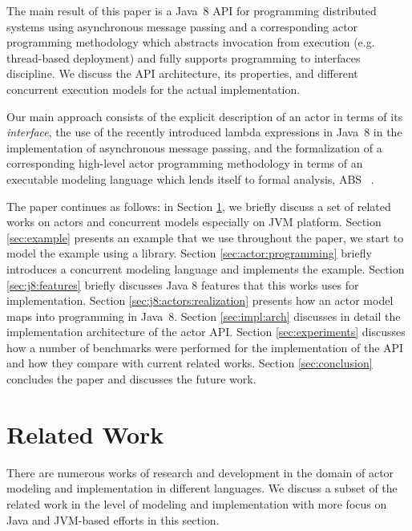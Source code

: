 The main result of this paper is a Java~8 API for programming distributed systems
using asynchronous message passing and a corresponding actor programming methodology 
which abstracts invocation from execution (e.g. thread-based deployment) and fully supports
 programming to interfaces discipline.
We  discuss the API architecture, its properties, and different concurrent execution models for the actual implementation.

Our main approach consists of the explicit description of an actor in terms of its \emph{interface}, 
the use of the recently introduced lambda expressions in Java~8 in the  implementation of asynchronous message passing,  
and the formalization of a corresponding high-level actor programming methodology in terms of an executable modeling language
which lends itself to formal analysis, ABS ~\cite{johnsen2012abs}.

The paper continues as follows: 
in Section \ref{sec:relatedwork}, we briefly discuss a set of related works on actors and concurrent models especially on JVM platform. 
Section \ref{sec:example} presents an example that we use throughout the paper, we start to model the example using a library. 
Section \ref{sec:actor:programming} briefly introduces a concurrent modeling language and implements the example.
Section \ref{sec:j8:features} briefly discusses Java 8 features that this works uses for implementation.
Section \ref{sec:j8:actors:realization} presents how an actor model maps into programming in Java~8.
Section \ref{sec:impl:arch} discusses in detail the implementation architecture of the actor API.
Section \ref{sec:experiments} discusses how a number of benchmarks were performed for the implementation of the API and how they compare with current related works.
Section \ref{sec:conclusion} concludes the paper and discusses the future work.

 
\section{Related Work}
\label{sec:relatedwork}

There are numerous works of research and development in the domain of actor modeling and implementation in different languages.
We discuss a subset of the related work in the level of modeling and implementation with more focus on Java and JVM-based efforts in this section.

